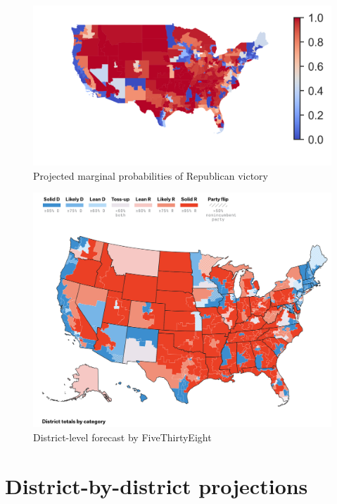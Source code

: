 \documentclass[12pt, letterpaper]{article}
\begin{document}
\begin{figure}[tbh]
  \centering
  \includegraphics[scale=1.7]{projected_map.png}
  \caption{Projected marginal probabilities of Republican victory}
  \label{fig:proj_map}
\end{figure}

\begin{figure}[tbh]
  \centering
  \includegraphics[scale=0.45]{538_map}
  \caption{District-level forecast by FiveThirtyEight}
  \label{fig:538_map}
\end{figure}

\section{District-by-district projections}



\end{document}
